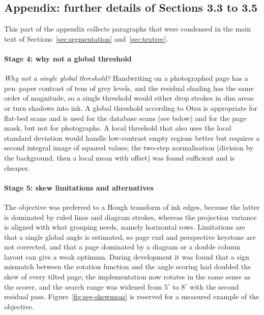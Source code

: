 \subsection{Appendix: further details of Sections 3.3 to 3.5}

This part of the appendix collects paragraphs that were condensed in the main text of Sections~\ref{sec:segmentation} and~\ref{sec:textrec}.

\paragraph{Stage 4: why not a global threshold}
\emph{Why not a single global threshold?} Handwriting on a photographed page has a pen--paper contrast of tens of grey levels, and the residual shading has the same order of magnitude, so a single threshold would either drop strokes in dim areas or turn shadows into ink.
A global threshold according to Otsu \cite{otsu1979} is appropriate for flat-bed scans and is used for the database scans (see below) and for the page mask, but not for photographs.
A local threshold that also uses the local standard deviation \cite{sauvola2000} would handle low-contrast empty regions better but requires a second integral image of squared values; the two-step normalisation (division by the background, then a local mean with offset) was found sufficient and is cheaper.


\paragraph{Stage 5: skew limitations and alternatives}
The objective was preferred to a Hough transform of ink edges, because the latter is dominated by ruled lines and diagram strokes, whereas the projection variance is aligned with what grouping needs, namely horizontal rows.
Limitations are that a single global angle is estimated, so page curl and perspective keystone are not corrected, and that a page dominated by a diagram or a double column layout can give a weak optimum.
During development it was found that a sign mismatch between the rotation function and the angle scoring had doubled the skew of every tilted page; the implementation now rotates in the same sense as the scorer, and the search range was widened from $5^\circ$ to $8^\circ$ with the second residual pass. Figure~\ref{fig:seg-skewmeas} is reserved for a measured example of the objective.



